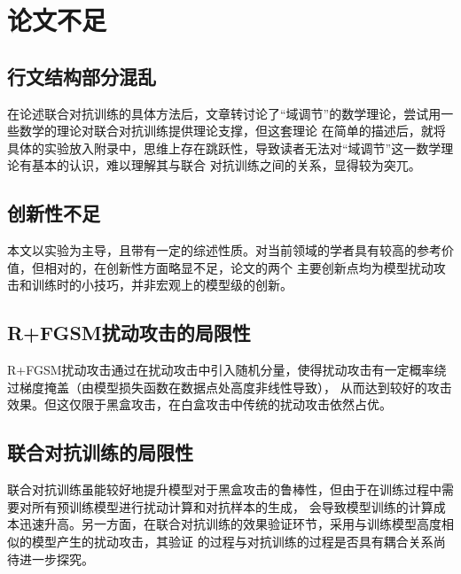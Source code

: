\chapter{论文不足}
\section{行文结构部分混乱}
在论述联合对抗训练的具体方法后，文章转讨论了“域调节”的数学理论，尝试用一些数学的理论对联合对抗训练提供理论支撑，但这套理论
在简单的描述后，就将具体的实验放入附录中，思维上存在跳跃性，导致读者无法对“域调节”这一数学理论有基本的认识，难以理解其与联合
对抗训练之间的关系，显得较为突兀。

\section{创新性不足}
本文以实验为主导，且带有一定的综述性质。对当前领域的学者具有较高的参考价值，但相对的，在创新性方面略显不足，论文的两个
主要创新点均为模型扰动攻击和训练时的小技巧，并非宏观上的模型级的创新。

\section{R+FGSM扰动攻击的局限性}
R+FGSM扰动攻击通过在扰动攻击中引入随机分量，使得扰动攻击有一定概率绕过梯度掩盖（由模型损失函数在数据点处高度非线性导致），
从而达到较好的攻击效果。但这仅限于黑盒攻击，在白盒攻击中传统的扰动攻击依然占优。

\section{联合对抗训练的局限性}
联合对抗训练虽能较好地提升模型对于黑盒攻击的鲁棒性，但由于在训练过程中需要对所有预训练模型进行扰动计算和对抗样本的生成，
会导致模型训练的计算成本迅速升高。另一方面，在联合对抗训练的效果验证环节，采用与训练模型高度相似的模型产生的扰动攻击，其验证
的过程与对抗训练的过程是否具有耦合关系尚待进一步探究。
